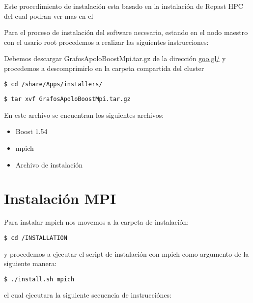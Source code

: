 Este procedimiento de instalación esta basado en la instalación de Repast HPC del cual podran ver mas en el


Para el proceso de instalación del software necesario, estando en el nodo maestro con el usario root procedemos a realizar las siguientes instrucciones: 


Debemos descargar GrafosApoloBoostMpi.tar.gz de la dirección \url{goo.gl/} y procedemos a descomprimirlo en la carpeta compartida del cluster

\begin{verbatim}
$ cd /share/Apps/installers/
\end{verbatim}

\begin{verbatim}
$ tar xvf GrafosApoloBoostMpi.tar.gz
\end{verbatim}

En este archivo se encuentran los siguientes archivos: 

\begin{itemize}
	\item Boost 1.54
	\item mpich 
	\item Archivo de instalación
\end{itemize}

\newpage

\section{Instalación MPI}

Para instalar mpich nos movemos a la carpeta de instalación:

\begin{verbatim}
$ cd /INSTALLATION
\end{verbatim}

y procedemos a ejecutar el script de instalación con mpich como argumento de la siguiente manera:

\begin{verbatim}
$ ./install.sh mpich
\end{verbatim}

el cual ejecutara la siguiente secuencia de instrucciónes: 

